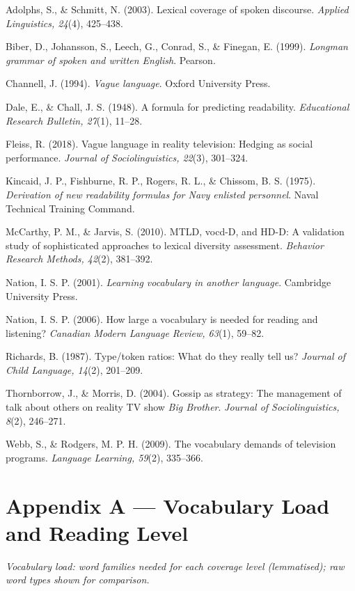 \documentclass[11pt]{article}
\begin{document}
Adolphs, S., \& Schmitt, N. (2003). Lexical coverage of spoken discourse. \emph{Applied Linguistics, 24}(4), 425--438.

Biber, D., Johansson, S., Leech, G., Conrad, S., \& Finegan, E. (1999). \emph{Longman grammar of spoken and written English}. Pearson.

Channell, J. (1994). \emph{Vague language}. Oxford University Press.

Dale, E., \& Chall, J. S. (1948). A formula for predicting readability. \emph{Educational Research Bulletin, 27}(1), 11--28.

Fleiss, R. (2018). Vague language in reality television: Hedging as social performance. \emph{Journal of Sociolinguistics, 22}(3), 301--324.

Kincaid, J. P., Fishburne, R. P., Rogers, R. L., \& Chissom, B. S. (1975). \emph{Derivation of new readability formulas for Navy enlisted personnel}. Naval Technical Training Command.

McCarthy, P. M., \& Jarvis, S. (2010). MTLD, vocd-D, and HD-D: A validation study of sophisticated approaches to lexical diversity assessment. \emph{Behavior Research Methods, 42}(2), 381--392.

Nation, I. S. P. (2001). \emph{Learning vocabulary in another language}. Cambridge University Press.

Nation, I. S. P. (2006). How large a vocabulary is needed for reading and listening? \emph{Canadian Modern Language Review, 63}(1), 59--82.

Richards, B. (1987). Type/token ratios: What do they really tell us? \emph{Journal of Child Language, 14}(2), 201--209.

Thornborrow, J., \& Morris, D. (2004). Gossip as strategy: The management of talk about others on reality TV show \emph{Big Brother}. \emph{Journal of Sociolinguistics, 8}(2), 246--271.

Webb, S., \& Rodgers, M. P. H. (2009). The vocabulary demands of television programs. \emph{Language Learning, 59}(2), 335--366.


\FloatBarrier
\needspace{0.18\textheight}
\section*{Appendix A --- Vocabulary Load and Reading Level}

\emph{Vocabulary load: word families needed for each coverage level (lemmatised); raw word types shown for comparison.}
\end{document}
